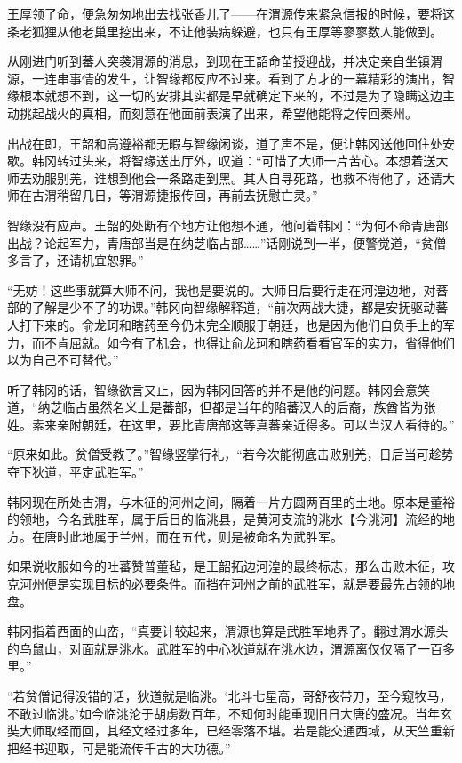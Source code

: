 王厚领了命，便急匆匆地出去找张香儿了——在渭源传来紧急信报的时候，要将这条老狐狸从他老巢里挖出来，不让他装病躲避，也只有王厚等寥寥数人能做到。

从刚进门听到蕃人突袭渭源的消息，到现在王韶命苗授迎战，并决定亲自坐镇渭源，一连串事情的发生，让智缘都反应不过来。看到了方才的一幕精彩的演出，智缘根本就想不到，这一切的安排其实都是早就确定下来的，不过是为了隐瞒这边主动挑起战火的真相，而刻意在他面前表演了出来，希望他能将之传回秦州。

出战在即，王韶和高遵裕都无暇与智缘闲谈，道了声不是，便让韩冈送他回住处安歇。韩冈转过头来，将智缘送出厅外，叹道：“可惜了大师一片苦心。本想着送大师去劝服别羌，谁想到他会一条路走到黑。其人自寻死路，也救不得他了，还请大师在古渭稍留几日，等渭源捷报传回，再前去抚慰亡灵。”

智缘没有应声。王韶的处断有个地方让他想不通，他问着韩冈：“为何不命青唐部出战？论起军力，青唐部当是在纳芝临占部……”话刚说到一半，便警觉道，“贫僧多言了，还请机宜恕罪。”

“无妨！这些事就算大师不问，我也是要说的。大师日后要行走在河湟边地，对蕃部的了解是少不了的功课。”韩冈向智缘解释道，“前次两战大捷，都是安抚驱动蕃人打下来的。俞龙珂和瞎药至今仍未完全顺服于朝廷，也是因为他们自负手上的军力，而不肯屈就。如今有了机会，也得让俞龙珂和瞎药看看官军的实力，省得他们以为自己不可替代。”

听了韩冈的话，智缘欲言又止，因为韩冈回答的并不是他的问题。韩冈会意笑道，“纳芝临占虽然名义上是蕃部，但都是当年的陷蕃汉人的后裔，族酋皆为张姓。素来亲附朝廷，在这里，要比青唐部这等真蕃亲近得多。可以当汉人看待的。”

“原来如此。贫僧受教了。”智缘竖掌行礼，“若今次能彻底击败别羌，日后当可趁势夺下狄道，平定武胜军。”

韩冈现在所处古渭，与木征的河州之间，隔着一片方圆两百里的土地。原本是董裕的领地，今名武胜军，属于后日的临洮县，是黄河支流的洮水【今洮河】流经的地方。在唐时此地属于兰州，而在五代，则是被命名为武胜军。

如果说收服如今的吐蕃赞普董毡，是王韶拓边河湟的最终标志，那么击败木征，攻克河州便是实现目标的必要条件。而挡在河州之前的武胜军，就是要最先占领的地盘。

韩冈指着西面的山峦，“真要计较起来，渭源也算是武胜军地界了。翻过渭水源头的鸟鼠山，对面就是洮水。武胜军的中心狄道就在洮水边，渭源离仅仅隔了一百多里。”

“若贫僧记得没错的话，狄道就是临洮。‘北斗七星高，哥舒夜带刀，至今窥牧马，不敢过临洮。’如今临洮沦于胡虏数百年，不知何时能重现旧日大唐的盛况。当年玄奘大师取经而回，其经文经过多年，已经零落不堪。若是能交通西域，从天竺重新把经书迎取，可是能流传千古的大功德。”

